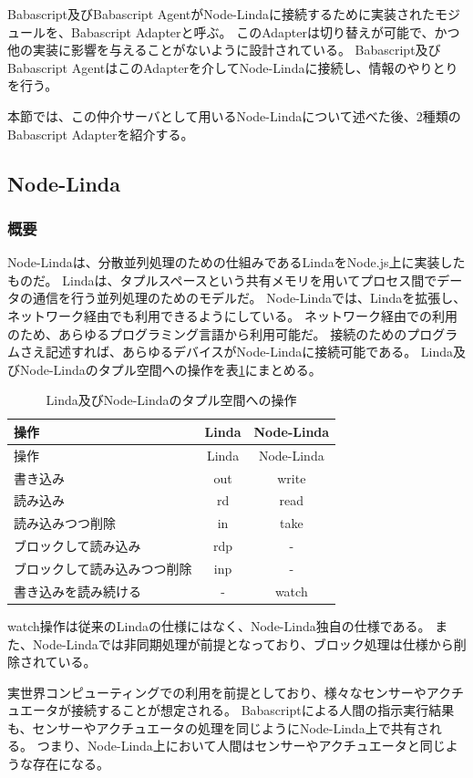 Babascript及びBabascript
AgentがNode-Lindaに接続するために実装されたモジュールを、Babascript
Adapterと呼ぶ。
このAdapterは切り替えが可能で、かつ他の実装に影響を与えることがないように設計されている。
Babascript及びBabascript
AgentはこのAdapterを介してNode-Lindaに接続し、情報のやりとりを行う。

本節では、この仲介サーバとして用いるNode-Lindaについて述べた後、2種類のBabascript
Adapterを紹介する。

\subsection{Node-Linda}\label{node-linda}

\subsubsection{概要}\label{ux6982ux8981}

Node-Linda\cite{node-linda}は、分散並列処理のための仕組みであるLinda\cite{linda}をNode.js上に実装したものだ。
Lindaは、タプルスペースという共有メモリを用いてプロセス間でデータの通信を行う並列処理のためのモデルだ。
Node-Lindaでは、Lindaを拡張し、ネットワーク経由でも利用できるようにしている。
ネットワーク経由での利用のため、あらゆるプログラミング言語から利用可能だ。
接続のためのプログラムさえ記述すれば、あらゆるデバイスがNode-Lindaに接続可能である。
Linda及びNode-Lindaのタプル空間への操作を表\ref{table:tuple-management}にまとめる。

\begin{longtable}[c]{@{}lcc@{}}
\caption{Linda及びNode-Lindaのタプル空間への操作
\label{table:tuple-management}}\tabularnewline
\toprule
操作 & Linda & Node-Linda\tabularnewline
\midrule
\endfirsthead
\toprule
操作 & Linda & Node-Linda\tabularnewline
\midrule
\endhead
書き込み & out & write\tabularnewline
読み込み & rd & read\tabularnewline
読み込みつつ削除 & in & take\tabularnewline
ブロックして読み込み & rdp & -\tabularnewline
ブロックして読み込みつつ削除 & inp & -\tabularnewline
書き込みを読み続ける & - & watch\tabularnewline
\bottomrule
\end{longtable}

watch操作は従来のLindaの仕様にはなく、Node-Linda独自の仕様である。
また、Node-Lindaでは非同期処理が前提となっており、ブロック処理は仕様から削除されている。

実世界コンピューティングでの利用を前提としており、様々なセンサーやアクチュエータが接続することが想定される。
Babascriptによる人間の指示実行結果も、センサーやアクチュエータの処理を同じようにNode-Linda上で共有される。
つまり、Node-Linda上において人間はセンサーやアクチュエータと同じような存在になる。

